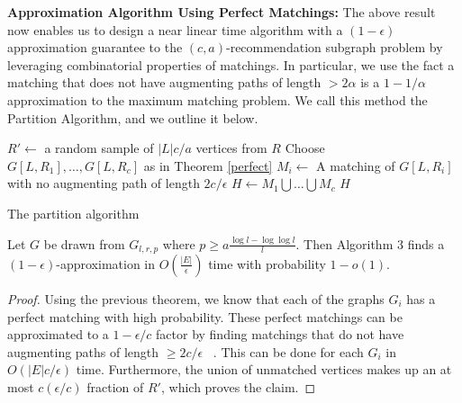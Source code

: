 %

{\bf Approximation Algorithm Using Perfect Matchings:}
The above result now enables us to design a near linear time
algorithm with a $(1-\epsilon)$ approximation guarantee
to the $(c,a)$-recommendation subgraph problem by leveraging
combinatorial properties of matchings. In particular, we use
the fact a matching that does not have augmenting paths of
length $>2\alpha$ is a $1-1/\alpha$ approximation to the maximum
matching problem. We call this method the Partition Algorithm,
and we outline it below.

\begin{algorithm}[h]\label{partition_alg}
  \SetAlgoLined
  $R' \leftarrow$ a random sample of $|L|c/a$ vertices from $R$\;
  Choose $G[L,R_1],\ldots,G[L,R_c]$ as in Theorem \ref{perfect}\;
   {
    $M_i \leftarrow$ A matching of $G[L,R_i]$ with no augmenting path of length $2c/\epsilon$\;
  }
  $H \leftarrow M_1\bigcup\ldots \bigcup M_c$\;
  \Return $H$\;
  \caption{The partition algorithm}
\end{algorithm}
\vspace{-.2cm}

\begin{thm}
Let $G$ be drawn from $G_{l,r,p}$ where $p \geq a\frac{\log l - \log\log l}{l}$.
Then Algorithm 3 finds a $(1-\epsilon)$-approximation
in $O(\frac{|E|}{\epsilon})$ time with probability $1-o(1)$.
\end{thm}
\begin{proof}
Using the previous theorem, we know that each of the graphs $G_i$ has a
perfect matching with high probability. These perfect matchings
can be approximated to a $1-\epsilon/c$ factor by finding matchings
that do not have augmenting paths of length $\geq 2c/\epsilon$
~\cite{LovaszPlummer1986}. This can be done for each $G_i$ in
$O(|E|c/\epsilon)$ time. Furthermore, the union of unmatched vertices
makes up an at most $c(\epsilon/c)$ fraction of $R'$, which proves the claim.
\end{proof}

